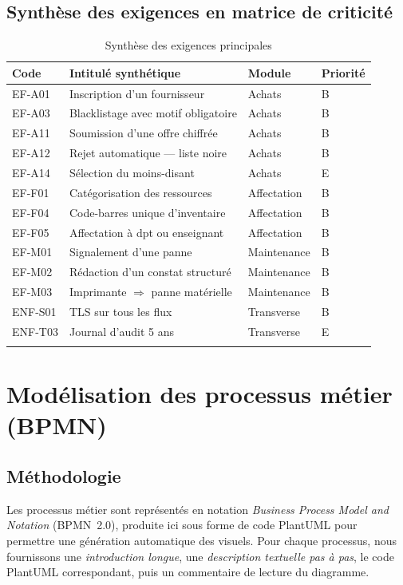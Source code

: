 \documentclass[a4paper,11pt,openany]{report}
\begin{document}
\section{Synthèse des exigences en matrice de criticité}

\begin{longtable}{p{2.5cm} p{8cm} p{1.5cm} p{1.8cm}}
\toprule
\textbf{Code} & \textbf{Intitulé synthétique} & \textbf{Module} &
\textbf{Priorité}\\
\midrule
\endhead
EF-A01 & Inscription d'un fournisseur & Achats & B \\
EF-A03 & Blacklistage avec motif obligatoire & Achats & B \\
EF-A11 & Soumission d'une offre chiffrée & Achats & B \\
EF-A12 & Rejet automatique --- liste noire & Achats & B \\
EF-A14 & Sélection du moins-disant & Achats & E \\
EF-F01 & Catégorisation des ressources & Affectation & B \\
EF-F04 & Code-barres unique d'inventaire & Affectation & B \\
EF-F05 & Affectation à dpt ou enseignant & Affectation & B \\
EF-M01 & Signalement d'une panne & Maintenance & B \\
EF-M02 & Rédaction d'un constat structuré & Maintenance & B \\
EF-M03 & Imprimante $\Rightarrow$ panne matérielle & Maintenance & B \\
ENF-S01 & TLS sur tous les flux & Transverse & B \\
ENF-T03 & Journal d'audit 5 ans & Transverse & E \\
\bottomrule
\caption{Synthèse des exigences principales}
\label{tab:matriceExigences}
\end{longtable}

\chapter{Modélisation des processus métier (BPMN)}

\section{Méthodologie}

Les processus métier sont représentés en notation \emph{Business
Process Model and Notation} (BPMN~2.0), produite ici sous forme
de code PlantUML pour permettre une génération automatique des
visuels. Pour chaque processus, nous fournissons une
\emph{introduction longue}, une \emph{description textuelle pas
à pas}, le code PlantUML correspondant, puis un commentaire de
lecture du diagramme.
\end{document}
